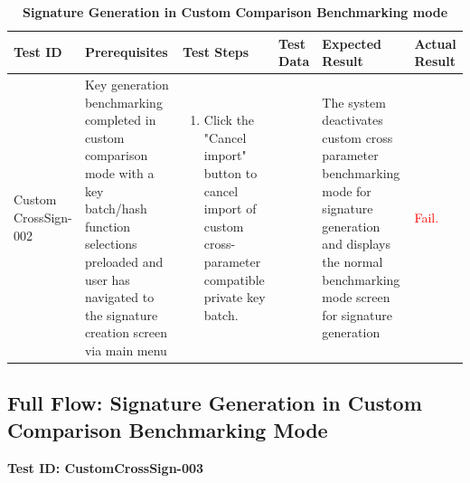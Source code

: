 \documentclass[]{final_report}
\theoremstyle{definition}
\begin{document}
\begin{longtable}{|p{1.5cm}|p{2.5cm}|p{3.5cm}|p{2.5cm}|p{3cm}|p{2cm}|}
  \caption{\textbf{Signature Generation in Custom Comparison Benchmarking mode}} \\
  \hline
  \textbf{Test ID} & \textbf{Prerequisites} & \textbf{Test Steps} & \textbf{Test Data} & \textbf{Expected Result} & \textbf{Actual Result} \\
  \hline
  Custom
  CrossSign-002 & Key generation benchmarking completed in custom comparison mode with a key batch/hash function selections preloaded and user has navigated to the signature creation screen via main menu & 
  \begin{enumerate}
    \item Click the "Cancel import" button to cancel import of custom cross-parameter compatible private key batch.
  \end{enumerate} &  & The system deactivates custom cross parameter benchmarking mode for signature generation and displays the normal benchmarking mode screen for signature generation &  \textcolor{red}{Fail.} \\
  \hline
\end{longtable}

\subsection*{Full Flow: Signature Generation in Custom Comparison Benchmarking Mode}

\textbf{Test ID: CustomCrossSign-003}
\end{document}
